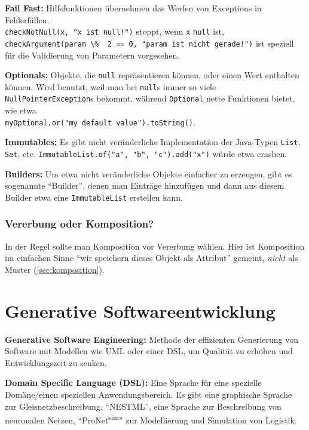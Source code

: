 \documentclass{panikzettel}
\begin{document}
\textbf{Fail Fast:} Hilfsfunktionen übernehmen das Werfen von Exceptions in Fehlerfällen. \\
\lstinline{checkNotNull(x, "x ist null!")} stoppt, wenn \lstinline{x} \lstinline{null} ist, \\
\lstinline{checkArgument(param \%  2 == 0, "param ist nicht gerade!")} ist speziell für die Validierung von Parametern vorgesehen.

\textbf{Optionals:} Objekte, die \lstinline{null} repräsentieren können, oder einen Wert enthalten können. Wird benutzt, weil man bei \lstinline{null}s immer so viele \lstinline{NullPointerException}s bekommt, während \lstinline{Optional} nette Funktionen bietet, wie etwa \\ \lstinline{myOptional.or("my default value").toString()}.

\textbf{Immutables:} Es gibt nicht veränderliche Implementation der Java-Typen \lstinline{List}, \lstinline{Set}, etc. \lstinline{ImmutableList.of("a", "b", "c").add("x")} würde etwa crashen.

\textbf{Builders:} Um etwa nicht veränderliche Objekte einfacher zu erzeugen, gibt es sogenannte ``Builder'', denen man Einträge hinzufügen und dann aus diesem Builder etwa eine \lstinline{ImmutableList} erstellen kann.

\subsubsection{Vererbung oder Komposition?}

In der Regel sollte man Komposition vor Vererbung wählen. Hier ist Komposition im einfachen Sinne ``wir speichern dieses Objekt als Attribut'' gemeint, \emph{nicht} als Muster (\ref{sec:komposition}).


\section{Generative Softwareentwicklung}
\label{sec:gensoft}

\textbf{Generative Software Engineering:} Methode der effizienten Generierung von Software mit Modellen wie UML oder einer DSL, um Qualität zu erhöhen und Entwicklungszeit zu senken.

\textbf{Domain Specific Language (DSL):} Eine Sprache für eine spezielle Domäne/einen speziellen Anwendungsbereich. Es gibt eine graphische Sprache zur Gleisnetzbeschreibung, ``NESTML'', eine Sprache zur Beschreibung von neuronalen Netzen, ``ProNet\textsuperscript{sim}'' zur Modellierung und Simulation von Logistik.
\end{document}
